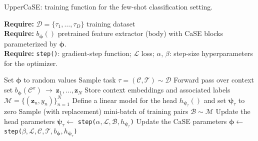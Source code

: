 \documentclass{article}
\begin{document}
\begin{algorithm}[H]
\small
\caption{UpperCaSE: training function for the few-shot classification setting.}
\label{alg:train_overview}
\textbf{Require:}  $\mathcal{D} = \{\tau_1, \dots, \tau_D\}$ training dataset \\
\textbf{Require:} $b_{\boldsymbol{\phi}}()$ pretrained feature extractor (body) with CaSE blocks parameterized by $\boldsymbol{\phi}$. \\
\textbf{Require:} \texttt{step()}: gradient-step function; $\mathcal{L}$ loss; $\alpha$, $\beta$: step-size hyperparameters for the optimizer.
\begin{algorithmic}[1]
\vspace{0.1cm} \State Set $\boldsymbol{\phi}$ to random values 
    \State Sample task $\tau=(\mathcal{C}, \mathcal{T}) \sim \mathcal{D}$
    \State Forward pass over context set $b_{\boldsymbol{\phi}}(\mathcal{C}^x) \ \rightarrow \ \mathbf{z}_1, \dots, \mathbf{z}_N$ 
    \State Store context embeddings and associated labels $\mathcal{M} = \{(\mathbf{z}_n, y_n)\}_{n=1}^{N}$ 
    \State Define a linear model for the head $h_{\boldsymbol{\psi}_{\tau}}()$ and set $\boldsymbol{\psi}_{\tau}$ to zero
     
        \State Sample (with replacement) mini-batch of training pairs $\mathcal{B} \sim \mathcal{M}$
        \State Update the head parameters $\boldsymbol{\psi}_{\tau} \leftarrow$ \texttt{step($\alpha, \mathcal{L}, \mathcal{B}, h_{\boldsymbol{\psi}_{\tau}}$)}
    \EndFor
    \State Update the CaSE parameters $\boldsymbol{\phi} \leftarrow$ \texttt{step($\beta, \mathcal{L}, \mathcal{C}, \mathcal{T}, b_{\boldsymbol{\phi}}, h_{\boldsymbol{\psi}_{\tau}}$)} 
\EndWhile
\vspace{0.1cm} \Statex
\end{algorithmic}
  \vspace{-0.4cm}\end{algorithm}
\end{document}

